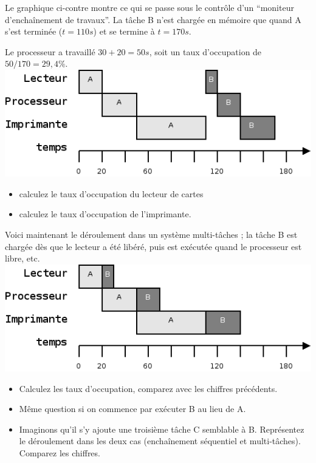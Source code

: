 \begin{multicols}{2}

Le graphique ci-contre montre ce qui se passe sous le contrôle d'un ``moniteur
d'enchaînement de travaux''. La tâche B n'est chargée en mémoire que
quand A s'est terminée ($t=110 s$) et se termine à $t=170 s$.

Le processeur a travaillé $30 + 20 = 50s$, soit un taux d'occupation de 
$50/170 = 29,4 \%$.
\includegraphics[width=.95\linewidth]{memoire-images/exemple-multitache-1.png}

\end{multicols}
\begin{exercice}
\begin{itemize}
\item calculez le taux d'occupation du lecteur de cartes
\item calculez le taux d'occupation de l'imprimante.
\end{itemize}
\end{exercice}

\begin{multicols}{2}
Voici maintenant le déroulement dans un système multi-tâches ; la tâche B est
chargée dès que le lecteur a été libéré, puis est exécutée quand le processeur
est libre, etc.
\includegraphics[width=.95\linewidth]{memoire-images/exemple-multitache-2.png}
\end{multicols}

\begin{exercice}
\begin{itemize}
\item Calculez les taux d'occupation, comparez avec les chiffres précédents.
\item Même question si on commence par exécuter B au lieu de A.
\item Imaginons qu'il s'y ajoute une troisième tâche C semblable à B. Représentez le déroulement dans les deux cas (enchaînement séquentiel et multi-tâches). Comparez les chiffres.
\end{itemize}
\end{exercice}

